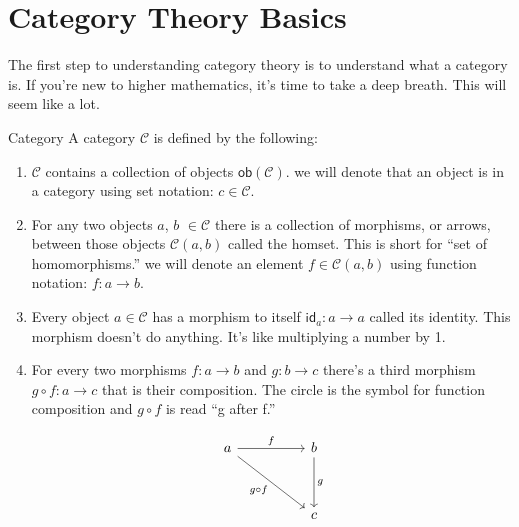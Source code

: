 \documentclass[12pt]{article}
\begin{document}
\section*{Category Theory Basics}
The first step to understanding category theory is to understand what a category is.
If you're new to higher mathematics, it's time to take a deep breath.
This will seem like a lot.

\begin{definition}{Category}{}
    A category $\mathcal{C}$ is defined by the following:
    \begin{enumerate}
        \item $\mathcal{C}$ contains a collection of objects $\mathsf{ob}(\mathcal{C})$. we will denote that an object is in a category using set notation: $c\in\mathcal{C}$.
        \item For any two objects $a$, $b$ $\in \mathcal{C}$ there is a collection of morphisms, or arrows, between those objects $\mathcal{C}(a,b)$ called the homset. This is short for ``set of homomorphisms.'' we will denote an element $f\in\mathcal{C}(a,b)$ using function notation: $f:a\rightarrow b$.
        \item Every object $a\in \mathcal{C}$ has a morphism to itself $\mathsf{id}_a:a\rightarrow a$ called its identity. This morphism doesn't do anything. It's like multiplying a number by 1.
        \item For every two morphisms $f:a\rightarrow b$ and $g: b\rightarrow c$ there's a third morphism $g\circ f:a\rightarrow c$ that is their composition. The circle is the symbol for function composition and $g \circ f$ is read ``g after f.''

              \[\begin{tikzcd}
                      a && b \\
                      \\
                      && c
                      \arrow["f", from=1-1, to=1-3]
                      \arrow["g", from=1-3, to=3-3]
                      \arrow["{g\circ f}"', from=1-1, to=3-3]
                  \end{tikzcd}\]

    \end{enumerate}
\end{definition}
\end{document}
